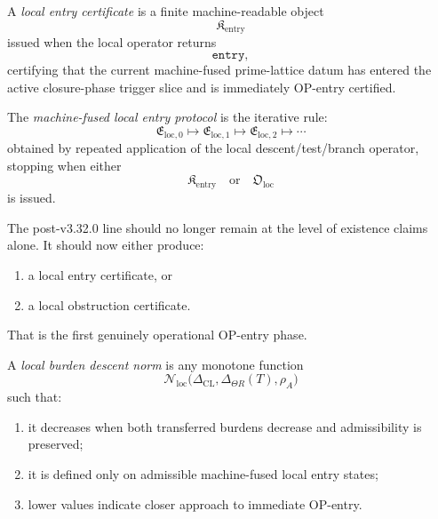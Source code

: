 \begin{definition}
\label{def:local-entry-certificate}
A \emph{local entry certificate} is a finite machine-readable object
\[
\mathfrak{K}_{\mathrm{entry}}
\]
issued when the local operator returns
\[
\mathtt{entry},
\]
certifying that the current machine-fused prime-lattice datum has entered the active closure-phase trigger slice and is immediately OP-entry certified.
\end{definition}

\begin{definition}
\label{def:machine-fused-local-entry-protocol}
The \emph{machine-fused local entry protocol} is the iterative rule:
\[
\mathfrak{E}_{\mathrm{loc},0}
\longmapsto
\mathfrak{E}_{\mathrm{loc},1}
\longmapsto
\mathfrak{E}_{\mathrm{loc},2}
\longmapsto \cdots
\]
obtained by repeated application of the local descent/test/branch operator, stopping when either
\[
\mathfrak{K}_{\mathrm{entry}}
\quad\text{or}\quad
\mathfrak{O}_{\mathrm{loc}}
\]
is issued.
\end{definition}

\begin{remark}
\label{rem:why-right-next-step-local-protocol}
The post-v3.32.0 line should no longer remain at the level of existence claims alone.
It should now either produce:
\begin{enumerate}
    \item a local entry certificate, or
    \item a local obstruction certificate.
\end{enumerate}
That is the first genuinely operational OP-entry phase.
\end{remark}

\begin{definition}
\label{def:local-burden-descent-norm}
A \emph{local burden descent norm} is any monotone function
\[
\mathcal{N}_{\mathrm{loc}}
\bigl(
\Delta_{\mathrm{CL}},
\Delta_{\Theta R}(T),
\rho_A
\bigr)
\]
such that:
\begin{enumerate}
    \item it decreases when both transferred burdens decrease and admissibility is preserved;
    \item it is defined only on admissible machine-fused local entry states;
    \item lower values indicate closer approach to immediate OP-entry.
\end{enumerate}
\end{definition}

